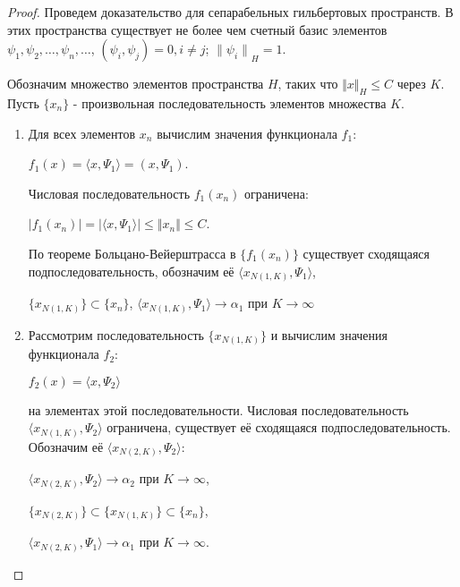 \documentclass[12pt,a4paper,titlepage,oneside]{book}
\theoremstyle{definition}
\theoremstyle{plain}
\theoremstyle{break}
\theoremstyle{remark}
\theoremstyle{remark}
\theoremstyle{remark}
\theoremstyle{remark}
\theoremstyle{plain}
\theoremstyle{plain}
\begin{document}
\begin{proof}
Проведем доказательство для сепарабельных гильбертовых пространств. В этих пространства существует не более чем счетный базис элементов $\psi_1, \psi_2, \ldots, \psi_n, \ldots$, $(\psi_i, \psi_j)=0, i\neq j$; ${\lVert \psi_i \rVert}_H=1$.

Обозначим множество элементов пространства $H$, таких что ${\Vert x \Vert} _H \leqslant C$ через $K$. Пусть $\lbrace x_n \rbrace$ - произвольная последовательность элементов множества $K$.

\begin{enumerate}
\item Для всех элементов $x_n$ вычислим значения функционала $f_1$:

\begin{center}
$f_1(x)= \langle x,\Psi_1 \rangle =(x,\Psi_1)$.
\end{center}
Числовая последовательность $f_1(x_n)$ ограничена:
\begin{center}
$\vert f_1(x_n)\vert = \vert \langle x,\Psi_1 \rangle \vert \leqslant \Vert x_n\Vert \leqslant C$.
\end{center}
По теореме Больцано-Вейерштрасса в $\lbrace f_1(x_n) \rbrace$ существует сходящаяся подпоследовательность, обозначим её 
$ \langle x_{N(1,K)},\Psi_1 \rangle $,
\begin{center}
$\lbrace x_{N(1,K)} \rbrace \subset
 \lbrace x_n \rbrace$, $ \langle x_{N(1,K)},\Psi_1 \rangle  \to \alpha_1$ при $K\to\infty$
\end{center}

\item Рассмотрим последовательность $\lbrace x_{N(1,K)} \rbrace$ и вычислим значения функционала $f_2$:
\begin{center}
$f_2(x)= \langle x,\Psi_2 \rangle $ 
\end{center}
на элементах этой последовательности. Числовая последовательность $  \langle  x_{N(1,K)},\Psi_2 \rangle $ ограничена, существует её сходящаяся подпоследовательность. Обозначим её 
$ \langle x_{N(2,K)},\Psi_2 \rangle $:
\begin{center}
$ \langle x_{N(2,K)},\Psi_2 \rangle  \to \alpha_2$ при
 $K\to\infty$, 
 \end{center}
 \begin{center}
$\lbrace x_{N(2,K)} \rbrace \subset 
\lbrace x_{N(1,K)} \rbrace \subset 
 \lbrace x_n \rbrace$,
  \end{center}
 \begin{center}
 $ \langle x_{N(2,K)},\Psi_1 \rangle  \to \alpha_1$ при
 $K\to\infty$. 
\end{center}
\end{enumerate}


\end{proof}
\end{document}
